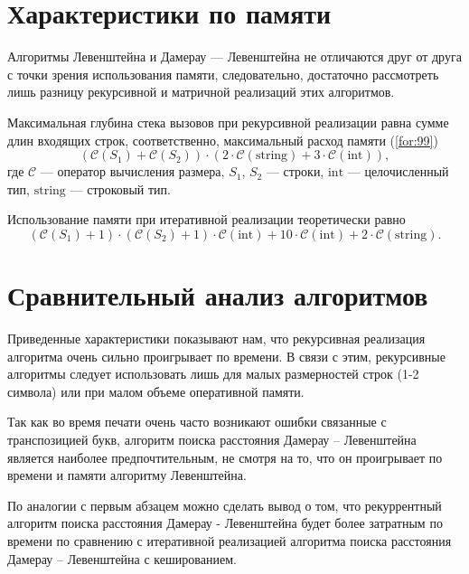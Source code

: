     \clearpage
    
    \section{Характеристики по памяти}
    
        Алгоритмы Левенштейна и Дамерау — Левенштейна не отличаются друг от друга с точки зрения использования памяти, следовательно, достаточно рассмотреть лишь разницу рекурсивной и матричной реализаций этих алгоритмов.
        
        Максимальная глубина стека вызовов при рекурсивной реализации равна сумме длин входящих строк, соответственно, максимальный расход памяти (\ref{for:99})
        \begin{equation}
        (\mathcal{C}(S_1) + \mathcal{C}(S_2)) \cdot (2 \cdot \mathcal{C}\mathrm{(string)} + 3 \cdot \mathcal{C}\mathrm{(int)}),
        \label{for:99}
        \end{equation}
        где $\mathcal{C}$ — оператор вычисления размера, $S_1$, $S_2$ — строки, $\mathrm{int}$ — целочисленный тип, $\mathrm{string}$ — строковый тип.
        
        Использование памяти при итеративной реализации теоретически равно
        \begin{equation}
        (\mathcal{C}(S_1) + 1) \cdot (\mathcal{C}(S_2) + 1) \cdot \mathcal{C}\mathrm{(int)} + 10\cdot \mathcal{C}\mathrm{(int)} + 2 \cdot \mathcal{C}\mathrm{(string)}.
        \end{equation}
        
    \section{Сравнительный анализ алгоритмов}
    
        Приведенные характеристики показывают нам, что рекурсивная реализация алгоритма очень сильно проигрывает по времени. В связи с этим, рекурсивные алгоритмы следует использовать лишь для малых размерностей строк (1-2 символа) или при малом объеме оперативной памяти.
        
        Так как во время печати очень часто возникают ошибки связанные с транспозицией букв, алгоритм поиска расстояния Дамерау – Левенштейна является наиболее предпочтительным, не смотря на то, что он проигрывает по времени и памяти алгоритму Левенштейна.
        
        По аналогии с первым абзацем можно сделать вывод о том, что рекуррентный алгоритм поиска расстояния Дамерау - Левенштейна будет более затратным по времени по сравнению с итеративной реализацией алгоритма поиска расстояния Дамерау – Левенштейна с кешированием.
    

